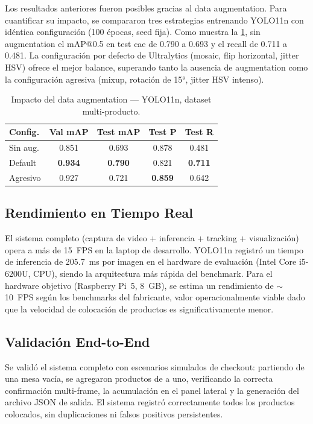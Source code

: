 \documentclass[conference,a4paper]{IEEEtran}[2015/08/26]
\begin{document}
Los resultados anteriores fueron posibles gracias al data augmentation. Para cuantificar su impacto, se compararon tres estrategias entrenando YOLO11n con idéntica configuración (100 épocas, seed fija). Como muestra la \cref{tab:augmentation}, sin augmentation el mAP@0.5 en test cae de 0.790 a 0.693 y el recall de 0.711 a 0.481. La configuración por defecto de Ultralytics (mosaic, flip horizontal, jitter HSV) ofrece el mejor balance, superando tanto la ausencia de augmentation como la configuración agresiva (mixup, rotación de 15°, jitter HSV intenso).

\begin{table}[htbp]
\centering
\caption{Impacto del data augmentation --- YOLO11n, dataset multi-producto.}
\label{tab:augmentation}
\small
\begin{tabular}{lcccc}
\hline
\textbf{Config.} & \textbf{Val mAP} & \textbf{Test mAP} & \textbf{Test P} & \textbf{Test R} \\
\hline
Sin aug.    & 0.851 & 0.693 & 0.878 & 0.481 \\
Default     & \textbf{0.934} & \textbf{0.790} & 0.821 & \textbf{0.711} \\
Agresivo    & 0.927 & 0.721 & \textbf{0.859} & 0.642 \\
\hline
\end{tabular}
\end{table}

\subsection{Rendimiento en Tiempo Real}

El sistema completo (captura de video + inferencia + tracking + visualización) opera a más de 15~FPS en la laptop de desarrollo. YOLO11n registró un tiempo de inferencia de 205.7~ms por imagen en el hardware de evaluación (Intel Core i5-6200U, CPU), siendo la arquitectura más rápida del benchmark. Para el hardware objetivo (Raspberry Pi~5, 8~GB), se estima un rendimiento de $\sim$10~FPS según los benchmarks del fabricante, valor operacionalmente viable dado que la velocidad de colocación de productos es significativamente menor.

\subsection{Validación End-to-End}

Se validó el sistema completo con escenarios simulados de checkout: partiendo de una mesa vacía, se agregaron productos de a uno, verificando la correcta confirmación multi-frame, la acumulación en el panel lateral y la generación del archivo JSON de salida. El sistema registró correctamente todos los productos colocados, sin duplicaciones ni falsos positivos persistentes.
\end{document}

